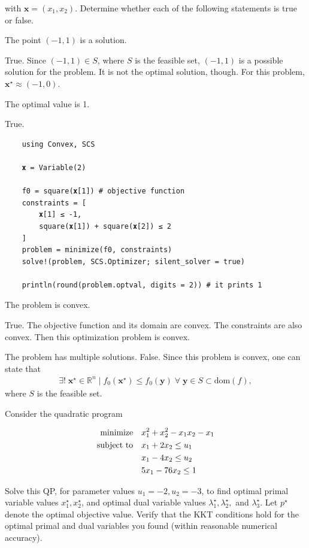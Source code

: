 \documentclass[12pt,a4paper]{article}
\begin{document}
with \(\mathbf{x} = (x_1, x_2)\). Determine whether each of the following statements is true or false.

\subproblem The point \((-1, 1)\) is a solution.

\subanswer True. Since \((-1, 1) \in S\), where \(S\) is the feasible set, \((-1, 1)\) is a possible solution for the problem. It is not the optimal solution, though. For this problem, \(\mathbf{x}^{\star} \approx (-1, 0)\).

\subproblem The optimal value is 1.

\subanswer True.

\begin{verbatim}
    using Convex, SCS

    𝐱 = Variable(2)

    f0 = square(𝐱[1]) # objective function
    constraints = [
        𝐱[1] ≤ -1,
        square(𝐱[1]) + square(𝐱[2]) ≤ 2
    ]
    problem = minimize(f0, constraints)
    solve!(problem, SCS.Optimizer; silent_solver = true)

    println(round(problem.optval, digits = 2)) # it prints 1
\end{verbatim}
\subproblem The problem is convex.

\subanswer True. The objective function and its domain are convex. The constraints are also convex. Then this optimization problem is convex.


\subproblem The problem has multiple solutions.
\subanswer False. Since this problem is convex, one can state that
\begin{align}
    \exists!\; \mathbf{x}^{\star} \in \mathbb{R}^{n} \mid f_0(\mathbf{x}^{\star}) \leq f_0(\mathbf{y})\;\forall\;\mathbf{y}\in S \subset \text{dom}(f),
\end{align}
where \(S\) is the feasible set.

\problem Consider the quadratic program

\begin{align}
    \qq*{minimize} & x_1^2 + x_2^2 - x_1x_2 - x_1  \nonumber \\
    \qq*{subject to}& x_1 + 2x_2 \leq u_1 \nonumber \\
     &  x_1 - 4x_2 \leq u_2 \nonumber \\
     & 5x_1 - 76x_2 \leq 1 \nonumber
\end{align}

Solve this QP, for parameter values \(u_1 = -2, u_2 = -3\), to find optimal primal variable values \(x_1^\star, x_2^\star\), and optimal dual variable values \(\lambda_1^\star, \lambda_2^\star,\) and \(\lambda_3^\star\). Let \(p^\star\) denote the optimal objective value. Verify that the KKT conditions hold for the optimal primal and dual variables you found (within reasonable numerical accuracy).
\end{document}
